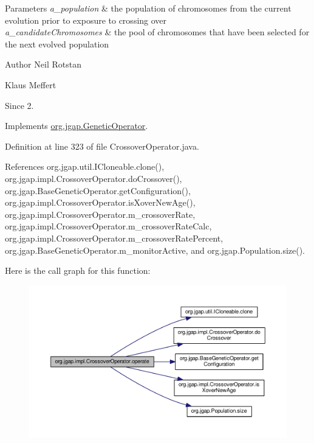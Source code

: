 \begin{DoxyParams}{Parameters}
{\em a\-\_\-population} & the population of chromosomes from the current evolution prior to exposure to crossing over \\
\hline
{\em a\-\_\-candidate\-Chromosomes} & the pool of chromosomes that have been selected for the next evolved population\\
\hline
\end{DoxyParams}
\begin{DoxyAuthor}{Author}
Neil Rotstan 

Klaus Meffert 
\end{DoxyAuthor}
\begin{DoxySince}{Since}
2. 
\end{DoxySince}


Implements \hyperlink{interfaceorg_1_1jgap_1_1_genetic_operator_a0f9dfe925c4c21e07522be67d6c5d084}{org.\-jgap.\-Genetic\-Operator}.



Definition at line 323 of file Crossover\-Operator.\-java.



References org.\-jgap.\-util.\-I\-Cloneable.\-clone(), org.\-jgap.\-impl.\-Crossover\-Operator.\-do\-Crossover(), org.\-jgap.\-Base\-Genetic\-Operator.\-get\-Configuration(), org.\-jgap.\-impl.\-Crossover\-Operator.\-is\-Xover\-New\-Age(), org.\-jgap.\-impl.\-Crossover\-Operator.\-m\-\_\-crossover\-Rate, org.\-jgap.\-impl.\-Crossover\-Operator.\-m\-\_\-crossover\-Rate\-Calc, org.\-jgap.\-impl.\-Crossover\-Operator.\-m\-\_\-crossover\-Rate\-Percent, org.\-jgap.\-Base\-Genetic\-Operator.\-m\-\_\-monitor\-Active, and org.\-jgap.\-Population.\-size().



Here is the call graph for this function\-:
\nopagebreak
\begin{figure}[H]
\begin{center}
\leavevmode
\includegraphics[width=350pt]{classorg_1_1jgap_1_1impl_1_1_crossover_operator_a271b82e98b398a42b576c956350d905e_cgraph}
\end{center}
\end{figure}


